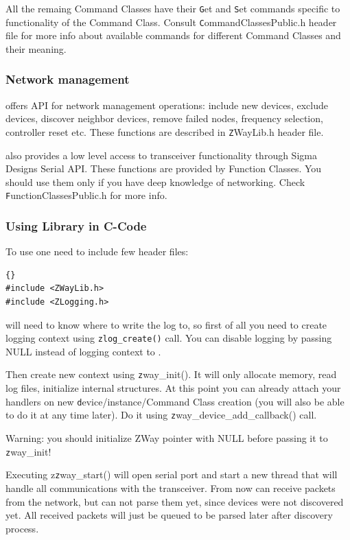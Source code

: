 All the remaing Command Classes have their {\texttt Get} and {\texttt Set }commands 
specific to functionality of the Command Class. Consult 
{\texttt CommandClassesPublic.h} header file for more info about available commands 
for different Command Classes and their meaning.

\subsubsection{Network management}

\zway offers API for network management operations: include new devices, exclude devices, 
discover neighbor devices, remove failed nodes, frequency selection, controller reset etc. 
These functions are described in {\texttt ZWayLib.h} header file.

\zway also provides a low level access to \zwave transceiver functionality through Sigma 
Designs Serial API. These functions are provided by Function Classes. You should use 
them only if you have deep knowledge of \zwave networking. Check 
{\texttt FunctionClassesPublic.h} for more info.

\subsubsection{Using \zway Library in C-Code}

To use \zway one need to include few header files:
\begin{lstlisting}[]{}
#include <ZWayLib.h>
#include <ZLogging.h>
\end{lstlisting}

\zway will need to know where to write the log to, so first of all you need to create 
logging context using \texttt{zlog\_create()} call. You can disable logging by passing NULL 
instead of logging context to \zway.

Then create new \zway context using {\texttt zway\_init()}. It will only allocate memory, 
read log files, initialize internal structures. At this point you can already attach your 
handlers on new {\texttt device/instance/Command Class} creation (you will also be able 
to do it at any time later). Do it using {\texttt zway\_device\_add\_callback()} call. 

Warning: you should initialize ZWay pointer with NULL before passing it to {\texttt zway\_init}!

Executing z{\texttt zway\_start()} will open serial port and start a new thread that 
will handle all communications with the transceiver. From now \zway can receive packets 
from the network, but can not parse them yet, since devices were not discovered yet. 
All received packets will just be queued to be parsed later after discovery process.

